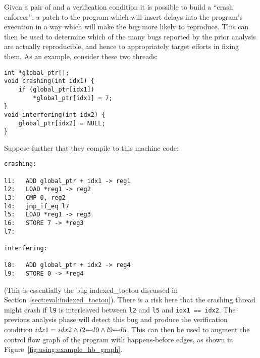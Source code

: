 
Given a pair of {\StateMachines} and a verification condition it is
possible to build a ``crash enforcer'': a patch to the program which
will insert delays into the program's execution in a way which will
make the bug more likely to reproduce.  This can then be used to
determine which of the many bugs reported by the prior analysis are
actually reproducible, and hence to appropriately target efforts in
fixing them.  As an example, consider these two threads:

\begin{verbatim}
int *global_ptr[];
void crashing(int idx1) {
    if (global_ptr[idx1])
        *global_ptr[idx1] = 7;
} 
void interfering(int idx2) {
    global_ptr[idx2] = NULL;
}
\end{verbatim}

Suppose further that they compile to this machine code:

\begin{verbatim}
crashing:

l1:   ADD global_ptr + idx1 -> reg1
l2:   LOAD *reg1 -> reg2
l3:   CMP 0, reg2
l4:   jmp_if_eq l7
l5:   LOAD *reg1 -> reg3
l6:   STORE 7 -> *reg3
l7:

interfering:

l8:   ADD global_ptr + idx2 -> reg4
l9:   STORE 0 -> *reg4
\end{verbatim}

(This is essentially the bug indexed\_toctou discussed in
Section~\ref{sect:eval:indexed_toctou}).  There is a risk here that
the crashing thread might crash if \verb|l9| is interleaved between
\verb|l2| and \verb|l5| and \verb|idx1 == idx2|.  The previous
analysis phase will detect this bug and produce the verification
condition $idx1 = idx2 \wedge l2 {\leftarrowtail} l9 \wedge
l9 {\leftarrowtail} l5$.  This can then be used to augment the control
flow graph of the program with happens-before edges, as shown in
Figure~\ref{fig:using:example_hb_graph}.

